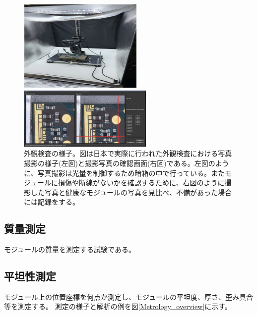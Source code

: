\begin{figure}[bpt]\centering
  \begin{minipage}{0.4\hsize}
    \begin{center}
    \includegraphics[width=60mm]{VI_setup}
    \end{center}
  \end{minipage}
  \begin{minipage}{0.4\hsize}
    \begin{center}
    \includegraphics[width=65mm]{VI_analysis}
    \end{center}
  \end{minipage}
  \caption[外観検査の様子]{外観検査の様子。図は日本で実際に行われた外観検査における写真撮影の様子(左図)と撮影写真の確認画面(右図)である。左図のように、写真撮影は光量を制御するため暗箱の中で行っている。またモジュールに損傷や断線がないかを確認するために、右図のように撮影した写真と健康なモジュールの写真を見比べ、不備があった場合には記録をする。}
  \label{VI_overview}
\end{figure}

\subsection{質量測定}
モジュールの質量を測定する試験である。

\subsection{平坦性測定}
モジュール上の位置座標を何点か測定し、モジュールの平坦度、厚さ、歪み具合等を測定する。
測定の様子と解析の例を図\ref{Metrology_overview}に示す。

